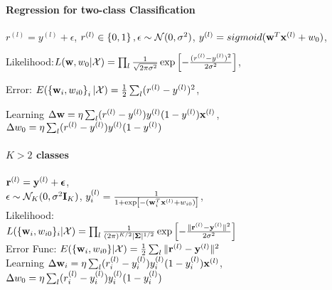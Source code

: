     \paragraph{Regression for two-class Classification} $r^{(l)} = y^{(l)}+\epsilon$,
        $r^{(l)}\in \left\{ 0,1 \right\}, \epsilon \sim \mathcal{N}(0, \sigma^2)$,
        $y^{(l)} = sigmoid(\mathbf{w}^T\mathbf{x}^{(l)}+w_0)$,

        Likelihood:$L(\mathbf{w}, w_0|\mathcal{X}) =
        \prod_l\frac{1}{\sqrt{2\pi\sigma^2}}\exp\left[
        -\frac{(r^{(l)}-y^{(l)})^2}{2\sigma^2} \right]$, 

        Error: $E(\left\{ \mathbf{w}_i, w_{i0} \right\}_i|\mathcal{X}) =
        \frac{1}{2}\sum_l(r^{(l)}-y^{(l)})^2$, 

        Learning $\Delta \mathbf{w} = \eta\sum_l(r^{(l)} - y^{(l)})y^{(l)}(1-y^{(l)})\mathbf{x}^{(l)}$, \\$\Delta
        w_0 = \eta\sum_l(r^{(l)}-y^{(l)})y^{(l)}(1-y^{(l)})$
    \paragraph{$K>2$ classes} $\mathbf{r}^{(l)} = \mathbf{y}^{(l)} +\boldsymbol\epsilon$, \\$\epsilon\sim
        \mathcal{N}_K(0, \sigma^2\mathbf{I}_K)$, $y^{(l)}_i = \frac{1}{1+\exp\left[
            -(\mathbf{w}_i^T\mathbf{x}^{(l)} + w_{i0})
        \right]}$, \\
        Likelihood:\\$L(\{\mathbf{w}_i, w_{i0}\}_i|\mathcal{X}) =
        \prod_l\frac{1}{(2\pi)^{K/2}|\boldsymbol\Sigma|^{1/2}}\exp\left[ -\frac{\|\mathbf{r}^{(l)} -
        \mathbf{y}^{(l)}\|^2}{2\sigma^2} \right]$\\
        Error Func: $E(\{\mathbf{w}_i, w_{i0}\}|\mathcal{X}) =
        \frac{1}{2}\sum_l\|\mathbf{r}^{(l)}-\mathbf{y}^{(l)}\|^2$\\
        Learning $\Delta \mathbf{w}_i = \eta\sum_l(r^{(l)}_i - y^{(l)}_i)y^{(l)}_i(1-y^{(l)}_i)\mathbf{x}^{(l)}$,\\ $\Delta
        w_0 = \eta\sum_l(r^{(l)}_i-y^{(l)}_i)y^{(l)}_i(1-y^{(l)}_i)$
